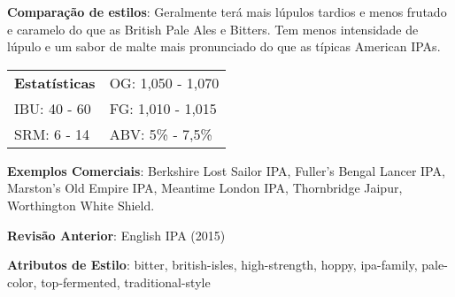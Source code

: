 \textbf{Comparação de estilos}: Geralmente terá mais lúpulos tardios e menos frutado e caramelo do que as British Pale Ales e Bitters. Tem menos intensidade de lúpulo e um sabor de malte mais pronunciado do que as típicas American IPAs.

\begin{tabular}{@{}p{35mm}p{35mm}@{}}
  \textbf{Estatísticas} & OG: 1,050 - 1,070 \\
  IBU: 40 - 60  & FG: 1,010 - 1,015  \\
  SRM: 6 - 14  & ABV: 5\% - 7,5\%
\end{tabular}

\textbf{Exemplos Comerciais}: Berkshire Lost Sailor IPA, Fuller's Bengal Lancer IPA, Marston’s Old Empire IPA, Meantime London IPA, Thornbridge Jaipur, Worthington White Shield.

\textbf{Revisão Anterior}: English IPA (2015)

\textbf{Atributos de Estilo}: bitter, british-isles, high-strength, hoppy, ipa-family, pale-color, top-fermented, traditional-style
